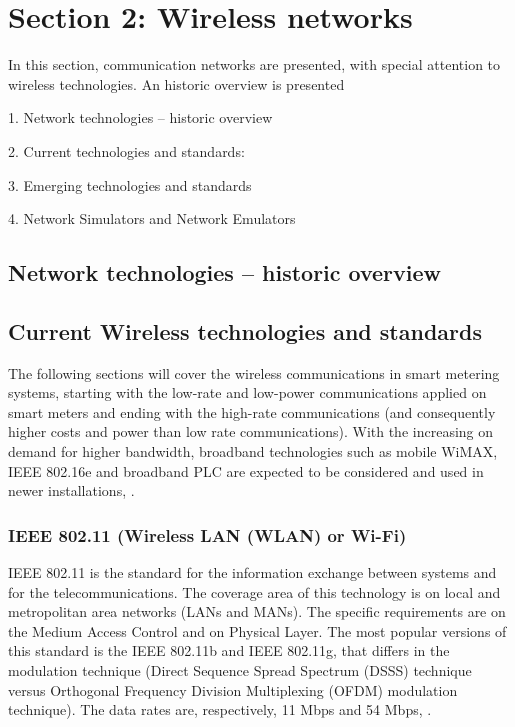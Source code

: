 



\section{Section 2: Wireless networks}

In this section, communication networks are presented, with special attention to wireless technologies. An historic overview is presented 



1.	Network technologies – historic overview

2.	Current technologies and standards:

3.	Emerging technologies and standards

4.	Network Simulators and Network Emulators






\subsection{Network technologies – historic overview}


\subsection{Current Wireless technologies and standards}

The following sections will cover the wireless communications in smart metering systems, starting with the low-rate and low-power communications applied on smart meters and ending with the high-rate communications (and consequently higher costs and power than low rate communications). With the increasing on demand for higher bandwidth, broadband technologies such as mobile WiMAX, IEEE 802.16e and broadband PLC are expected to be considered and used in newer installations, \cite{Mohassel2014}.



\subsubsection{IEEE 802.11 (Wireless LAN (WLAN) or Wi-Fi)}

IEEE 802.11 is the standard for the information exchange between systems and for the telecommunications. The coverage area of this technology is on local and metropolitan area networks (LANs and MANs). The specific requirements are on the Medium Access Control and on Physical Layer. The most popular versions of this standard is the IEEE 802.11b and IEEE 802.11g, that differs in the modulation technique (Direct Sequence Spread Spectrum (DSSS) technique versus Orthogonal Frequency Division Multiplexing (OFDM) modulation technique). The data rates are, respectively, 11 Mbps and 54 Mbps, \cite{Usman2013, ieee2012}.



